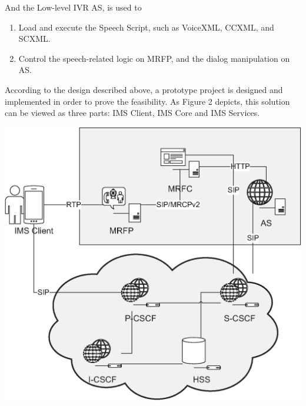 \documentclass[a0,landscape]{a0poster}
\begin{document}
\begin{multicols}{4}
And the Low-level IVR AS, is used to
\begin{enumerate}
\item Load and execute the Speech Script, such as VoiceXML, CCXML, and SCXML.
\item Control the speech-related logic on MRFP, and the dialog manipulation on AS.
\end{enumerate}

According to the design described above, a prototype project is designed and implemented in order to prove the feasibility. As Figure 2 depicts, this solution can be viewed as three parts: IMS Client, IMS Core and IMS Services.

\begin{center}\vspace{1cm}
\includegraphics[width=0.6\linewidth]{Architecture.eps}
\end{center}\vspace{1cm}


\end{multicols}
\end{document}
